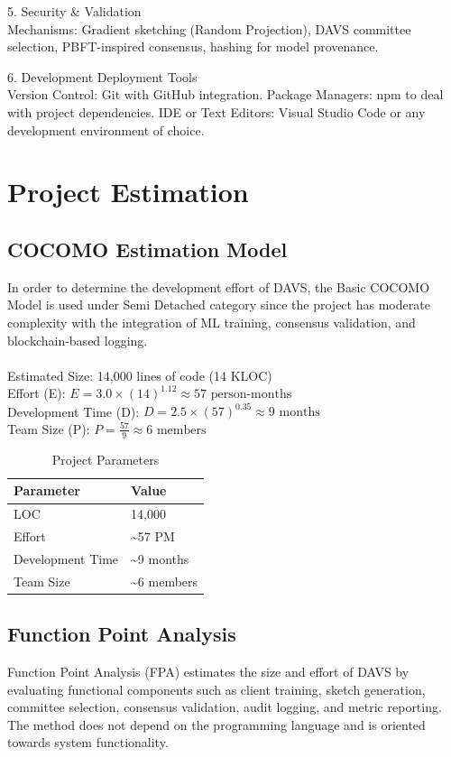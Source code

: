 5. Security \& Validation\\
Mechanisms: Gradient sketching (Random Projection), DAVS committee selection, PBFT-inspired consensus, hashing for model provenance.

6. Development Deployment Tools\\
Version Control: Git with GitHub integration.
Package Managers: npm to deal with project dependencies.
IDE or Text Editors: Visual Studio Code or any development environment of choice.



\section{Project Estimation}

\subsection{COCOMO Estimation Model}
In order to determine the development effort of DAVS, the Basic COCOMO Model is used under Semi Detached category since the project has moderate complexity with the integration of ML training, consensus validation, and blockchain-based logging.
\\
\\
Estimated Size: 14,000 lines of code (14 KLOC)\\
Effort (E): $E = 3.0 \times (14)^{1.12} \approx 57 \text{ person-months}$\\
Development Time (D): $D = 2.5 \times (57)^{0.35} \approx 9 \text{ months}$\\
Team Size (P): $P = \frac{57}{9} \approx 6 \text{ members}$

\begin{table}[h!]
\centering
\begin{tabular}{|l|l|}
\hline
\textbf{Parameter}        & \textbf{Value}       \\
\hline
LOC                      & 14,000             \\
Effort                   & \textasciitilde57 PM    \\
Development Time         & \textasciitilde9 months \\
Team Size                & \textasciitilde6 members \\
\hline
\end{tabular}
\caption{Project Parameters}
\label{tab:project_parameters}
\end{table}


\subsection{Function Point Analysis}
Function Point Analysis (FPA) estimates the size and effort of DAVS by evaluating functional components such as client training, sketch generation, committee selection, consensus validation, audit logging, and metric reporting. The method does not depend on the programming language and is oriented towards system functionality.

